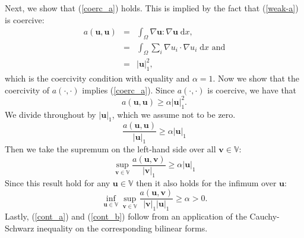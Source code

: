 \documentclass[12pt,a4paper]{article}
\theoremstyle{definition}
\begin{document}
Next, we show that (\ref{coerc_a}) holds.  This is implied by the fact that (\ref{weak-a}) is coercive:
\begin{eqnarray}
		a\left(\textbf{u},\textbf{u}\right)&=&\int_{\Omega}\nabla \textbf{u} : \nabla \textbf{u}\;\mathrm{d}x,\nonumber\\
		&=&\int_{\Omega}\sum_{i}\nabla u_i \cdot \nabla u_i\;\mathrm{d}x\text{ and}\nonumber\\
		&=&\left|\textbf{u}\right|_1^2,\nonumber
\end{eqnarray}
which is the coercivity condition with equality and $\alpha = 1$.  Now we show that  the coercivity of $a\left(\cdot,\cdot\right)$ implies (\ref{coerc_a}).  Since $a\left(\cdot,\cdot\right)$ is coercive, we have that
\begin{equation}
a\left(\textbf{u},\textbf{u}\right)\geq \alpha  \left|\textbf{u}\right|_1^2 \nonumber.
\end{equation}
We divide throughout by $\left|\textbf{u}\right|_1$, which we assume not to be zero. 
\begin{equation}
\frac{a\left(\textbf{u},\textbf{u}\right)}{\left|\textbf{u}\right|_1}\geq \alpha \left|\textbf{u}\right|_1 \nonumber
\end{equation}
 Then we take the supremum on the left-hand side over all $\textbf{v}\in\mathbb{V}$:
 \begin{equation}
 \sup_{\textbf{v}\in \mathbb{V}}\frac{a\left(\textbf{u},\textbf{v}\right)}{\left|\textbf{v}\right|_1}\geq \alpha \left|\textbf{u}\right|_1\nonumber
 \end{equation}
 Since this result hold for any $\textbf{u}\in \mathbb{V}$ then it also holds for the infimum over $\textbf{u}$:
\begin{equation}
\inf_{\textbf{u}\in \mathbb{V}}\sup_{\textbf{v}\in \mathbb{V}}\frac{a\left(\textbf{u},\textbf{v}\right)}{\left|\textbf{v}\right|_1\left|\textbf{u}\right|_1} \geq \alpha>0\nonumber.
\end{equation}
Lastly, (\ref{cont_a}) and (\ref{cont_b}) follow from an application of the Cauchy-Schwarz inequality on the corresponding bilinear forms.
\end{document}
